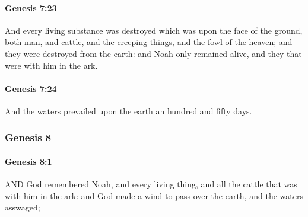 		\paragraph{Genesis 7:23} %
			\label{GENESIS-7-23}

			And every living substance was destroyed which was upon the face of the ground, both man, and cattle, and the creeping things, and the fowl of the heaven; and they were destroyed from the earth: and Noah only remained alive, and they that were with him in the ark.


		\paragraph{Genesis 7:24} %
			\label{GENESIS-7-24}

			And the waters prevailed upon the earth an hundred and fifty days.


	\subsubsection{Genesis 8} %
		\label{GENESIS-8}
		
		\paragraph{Genesis 8:1} %
			\label{GENESIS-8-1}

			AND God remembered Noah, and every living thing, and all the cattle that was with him in the ark: and God made a wind to pass over the earth, and the waters asswaged;

